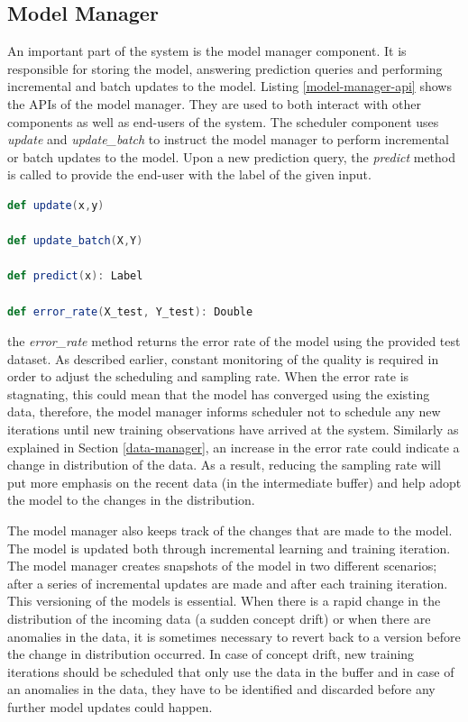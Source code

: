 \documentclass{sig-alternate-05-2015}
\begin{document}
\subsection{Model Manager} \label{model-manager} 
An important part of the system is the model manager component.
It is responsible for storing the model, answering prediction queries and performing incremental and batch updates to the model.
Listing \ref{model-manager-api} shows the APIs of the model manager.
They are used to both interact with other components as well as end-users of the system.
The scheduler component uses \textit{update} and \textit{update\_batch} to instruct the model manager to perform incremental or batch updates to the model.
Upon a new prediction query, the \textit{predict} method is called to provide the end-user with the label of the given input.
\noindent\hspace{-0.1\linewidth}\begin{minipage}[t]{\linewidth}
\begin{lstlisting}[language=Scala, basicstyle=\small\ttfamily, frame=tb ,columns=fullflexible,
showstringspaces=false,label=model-manager-api,caption=Model Manager API, numberstyle=\tiny]
def update(x,y)

def update_batch(X,Y)

def predict(x): Label

def error_rate(X_test, Y_test): Double

\end{lstlisting}
\end{minipage}
the \textit{error\_rate} method returns the error rate of the model using the provided test dataset.
As described earlier, constant monitoring of the quality is required in order to adjust the scheduling and sampling rate.
When the error rate is stagnating, this could mean that the model has converged using the existing data, therefore, the model manager informs scheduler not to schedule any new iterations until new training observations have arrived at the system.
Similarly as explained in Section \ref{data-manager}, an increase in the error rate could indicate a change in distribution of the data.
As a result, reducing the sampling rate will put more emphasis on the recent data (in the intermediate buffer) and help adopt the model to the changes in the distribution.

The model manager also keeps track of the changes that are made to the model.
The model is updated both through incremental learning and training iteration.
The model manager creates snapshots of the model in two different scenarios; after a series of incremental updates are made and after each training iteration.
This versioning of the models is essential.
When there is a rapid change in the distribution of the incoming data (a sudden concept drift) or when there are anomalies in the data, it is sometimes necessary to revert back to a version before the change in distribution occurred.
In case of concept drift, new training iterations should be scheduled that only use the data in the buffer and in case of an anomalies in the data, they have to be identified and discarded before any further model updates could happen.
\end{document}
